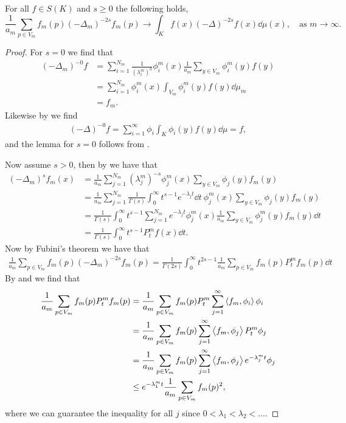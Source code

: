 \begin{lemma}\label{convergence}
	For all $f \in S(K)$ and $s \geq 0$ the following holds,
	\begin{equation}
		\frac{1}{a_m} \sum_{p \in V_m} f_m(p) (-\Delta_m)^{-2s}f_m(p) \to \int_{K}f(x)(-\Delta)^{-2s}f(x) \dd \mu(x), \quad \text{as } m \to \infty.
	\end{equation}
\end{lemma}
\begin{proof}
	For $s = 0$  we find that 
	\begin{align}
		(-\Delta_m)^{-0} f&= \sum_{i = 1}^{N_m} \frac{1}{(\lambda_i^{m})^{0}} \phi_{i}^{m}(x) \frac{1}{a_m} \sum_{y \in V_m} \phi_{i}^{m}(y) f(y) \\
		&= \sum_{i = 1}^{N_m} \phi_{i}^{m}(x) \int_{V_m} \phi_i^{m}(y)f(y) \dd \mu_{m} \\
		& = f_m.
	\end{align}
	Likewise by  we find
	\begin{align}
		(-\Delta)^{-0} f = \sum_{i = 1}^{\infty} \phi_{i} \int_{K} \phi_i(y) f(y) \dd \mu = f,
	\end{align}
	and the lemma for $s = 0$ follows from . 
	
		\noi Now assume $s > 0$, then by  we have that
	\begin{align}
		(-\Delta_m)^{s}f_m(x) &= \frac{1}{a_m} \sum_{j = 1}^{N_m} (\lambda_j^{m})^{-s} \phi_j^{m}(x) \sum_{y \in V_m} \phi_j(y) f_m(y) \\
		&= \frac{1}{a_m} \sum_{j = 1}^{N_m} \frac{1}{\Gamma(s)}\int_{0}^{\infty} t^{s-1}e^{-\lambda_j t} \dd t \ \phi_j^{m}(x) \sum_{y \in V_m} \phi_j(y) f_m(y) \\
		&= \frac{1}{\Gamma(s)}\int_{0}^{\infty} t^{s-1} \sum_{j = 1}^{N_m} e^{-\lambda_j t} \phi_j^{m}(x)  \frac{1}{a_m}\sum_{y \in V_m} \phi_j^{m}(y) f_m(y) \dd t \\
		&= \frac{1}{\Gamma(s)} \int_{0}^{\infty} t^{s-1} P_t^{m}f(x) \dd t.
	\end{align}
	 Now by Fubini's theorem we have that
	\begin{align}
		\frac{1}{a_m} \sum_{p \in V_m} f_m(p) (-\Delta_{m})^{-2s}f_m(p)  = \frac{1}{\Gamma(2s)} \int_{0}^{\infty} t^{2s-1} \frac{1}{a_m} \sum_{p \in V_m} f_m(p) P_{t}^{m} f_m(p) \dd t
	\end{align}
	By  and  we find that
	\begin{align}
		\frac{1}{a_m} \sum_{p \in V_m} f_m(p) P_{t}^{m} f_m(p) &= \frac{1}{a_m} \sum_{p \in V_m} f_m(p) P_{t}^{m} \sum_{j =1}^{\infty} \inn{f_m}{\phi_i} \phi_{i} \\
		&= \frac{1}{a_m} \sum_{p \in V_m} f_m(p) \sum_{j =1}^{\infty} \inn{f_m}{\phi_j} P_{t}^{m} \phi_{j} \\
		& = \frac{1}{a_m} \sum_{p \in V_m} f_m(p) \sum_{j =1}^{\infty} \inn{f_m}{\phi_j} e^{-\lambda_{j}^{m} t} \phi_{j} \\
		&\leq e^{-\lambda_1^{m}t} \frac{1}{a_m} \sum_{p \in V_m} f_m(p)^2,
	\end{align}
	where we can guarantee the inequality for all $j$ since $0 < \lambda_1 < \lambda_2 <\ldots$. 
	

\end{proof}

